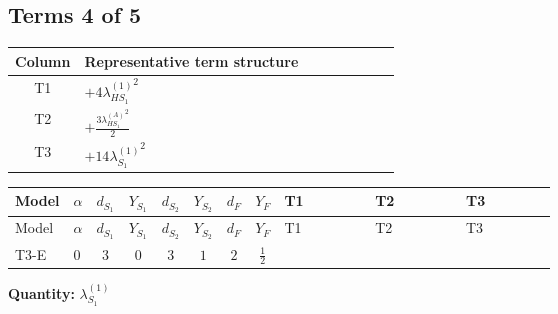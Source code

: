 \documentclass[8pt]{article}
\begin{document}
\begin{landscape}
\subsection*{Terms 4 of 5}
\begin{center}
\begin{tabular}{@{}c >{\raggedright\arraybackslash}p{0.82\linewidth}@{}}
\toprule
Column & Representative term structure \\
\midrule
T1 & \(\displaystyle +4 {\lambda_{HS_1}^{(1)}}^2\) \\
\midrule
T2 & \(\displaystyle +\frac{3 {\lambda_{HS_1}^{(A)}}^2}{2}\) \\
\midrule
T3 & \(\displaystyle +14 {\lambda_{S_1}^{(1)}}^2\) \\
\midrule
\bottomrule
\end{tabular}
\end{center}
\smallskip
\tiny
\begin{longtable}{@{}llcccccc >{\raggedright\arraybackslash}p{0.21\linewidth} >{\raggedright\arraybackslash}p{0.21\linewidth} >{\raggedright\arraybackslash}p{0.21\linewidth}@{}}
\toprule
Model & $\alpha$ & $d_{S_1}$ & $Y_{S_1}$ & $d_{S_2}$ & $Y_{S_2}$ & $d_F$ & $Y_F$ & T1 & T2 & T3 \\
\midrule
\endfirsthead
\toprule
Model & $\alpha$ & $d_{S_1}$ & $Y_{S_1}$ & $d_{S_2}$ & $Y_{S_2}$ & $d_F$ & $Y_F$ & T1 & T2 & T3 \\
\midrule
\endhead
T3-E & $0$ & $3$ & $0$ & $3$ & $1$ & $2$ & $\frac{1}{2}$ & \scriptsize\adjustbox{max width=\linewidth}{$\begin{gathered} +4 {\lambda_{HS_1}^{(1)}}^2\end{gathered}$} & \scriptsize\adjustbox{max width=\linewidth}{$\begin{gathered} +\frac{3 {\lambda_{HS_1}^{(A)}}^2}{2}\end{gathered}$} & \scriptsize\adjustbox{max width=\linewidth}{$\begin{gathered} +14 {\lambda_{S_1}^{(1)}}^2\end{gathered}$} \\
\midrule
\bottomrule
\end{longtable}
\clearpage
\noindent\textbf{Quantity: }$\lambda_{S_1}^{(1)}$\par\smallskip

\end{landscape}
\end{document}
